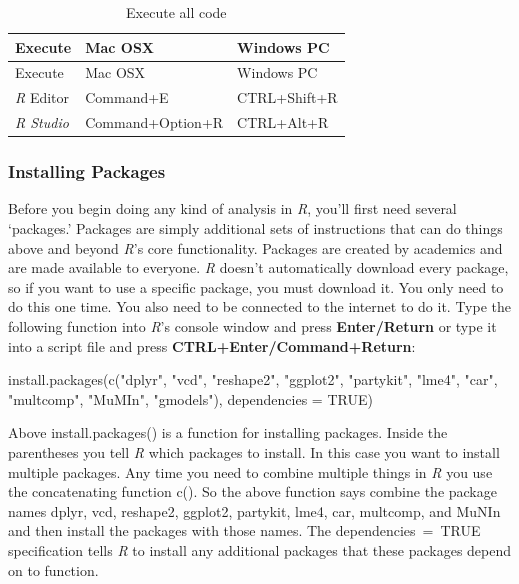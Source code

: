 \documentclass[
  10pt,
  letterpaper]{article}
\newenvironment{Shaded}{\begin{snugshade}}{\end{snugshade}}
\newcommand{\AttributeTok}[1]{\textcolor[rgb]{0.40,0.45,0.13}{#1}}
\newcommand{\ConstantTok}[1]{\textcolor[rgb]{0.56,0.35,0.01}{#1}}
\newcommand{\FunctionTok}[1]{\textcolor[rgb]{0.28,0.35,0.67}{#1}}
\newcommand{\NormalTok}[1]{\textcolor[rgb]{0.00,0.23,0.31}{#1}}
\newcommand{\StringTok}[1]{\textcolor[rgb]{0.13,0.47,0.30}{#1}}
\renewcommand\texttt[1]{{\ttfamily\color{BrickRed}#1}}
\begin{document}
\hypertarget{tbl-executeall}{}
\begin{longtable}[]{@{}lll@{}}
\caption{\label{tbl-executeall}Execute all code}\tabularnewline
\toprule()
Execute & Mac OSX & Windows PC \\
\midrule()
\endfirsthead
\toprule()
Execute & Mac OSX & Windows PC \\
\midrule()
\endhead
\emph{R} Editor & \texttt{Command+E} & \texttt{CTRL+Shift+R} \\
\emph{R Studio} & \texttt{Command+Option+R} & \texttt{CTRL+Alt+R} \\
\bottomrule()
\end{longtable}

\hypertarget{installing-packages}{%
\subsubsection{Installing Packages}\label{installing-packages}}

Before you begin doing any kind of analysis in \emph{R}, you'll first
need several `packages.' Packages are simply additional sets of
instructions that can do things above and beyond \emph{R}'s core
functionality. Packages are created by academics and are made available
to everyone. \emph{R} doesn't automatically download every package, so
if you want to use a specific package, you must download it. You only
need to do this one time. You also need to be connected to the internet
to do it. Type the following function into \emph{R}'s console window and
press \textbf{Enter/Return} or type it into a script file and press
\textbf{CTRL+Enter/Command+Return}:

\begin{Shaded}
\begin{Highlighting}[]
\FunctionTok{install.packages}\NormalTok{(}\FunctionTok{c}\NormalTok{(}\StringTok{"dplyr"}\NormalTok{, }\StringTok{"vcd"}\NormalTok{, }\StringTok{"reshape2"}\NormalTok{, }\StringTok{"ggplot2"}\NormalTok{,}
    \StringTok{"partykit"}\NormalTok{, }\StringTok{"lme4"}\NormalTok{, }\StringTok{"car"}\NormalTok{, }\StringTok{"multcomp"}\NormalTok{, }\StringTok{"MuMIn"}\NormalTok{,}
    \StringTok{"gmodels"}\NormalTok{), }\AttributeTok{dependencies =} \ConstantTok{TRUE}\NormalTok{)}
\end{Highlighting}
\end{Shaded}

Above \texttt{install.packages()} is a function for installing packages.
Inside the parentheses you tell \emph{R} which packages to install. In
this case you want to install multiple packages. Any time you need to
combine multiple things in \emph{R} you use the concatenating function
\texttt{c()}. So the above function says combine the package names
\texttt{dplyr}, \texttt{vcd}, \texttt{reshape2}, \texttt{ggplot2},
\texttt{partykit}, \texttt{lme4}, \texttt{car}, \texttt{multcomp}, and
\texttt{MuNIn} and then install the packages with those names. The
\texttt{dependencies\ =\ TRUE} specification tells \emph{R} to install
any additional packages that these packages depend on to function.
\end{document}
